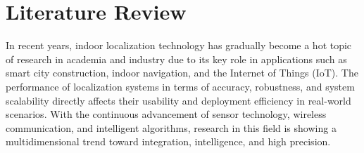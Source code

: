 \documentclass[12pt,a4paper]{article}
\numberwithin{equation}{section}
\begin{document}
\section{Literature Review}
In recent years, indoor localization technology has gradually become a hot topic of research in academia and industry due to its key role in applications such as smart city construction, indoor navigation, and the Internet of Things (IoT). The performance of localization systems in terms of accuracy, robustness, and system scalability directly affects their usability and deployment efficiency in real-world scenarios. With the continuous advancement of sensor technology, wireless communication, and intelligent algorithms, research in this field is showing a multidimensional trend toward integration, intelligence, and high precision.
\end{document}
